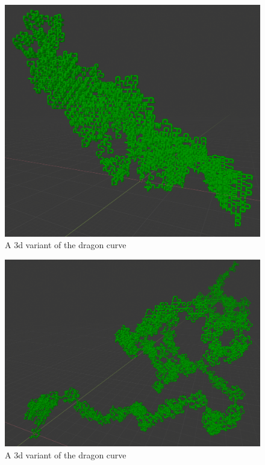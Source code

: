 \begin{figure}[H]
    \centering
    \includegraphics[width=\textwidth]{figures/L-systems/dragon0-3d.png}
    \caption{A 3d variant of the dragon curve}
\end{figure}

\begin{figure}[H]
    \centering
    \includegraphics[width=\textwidth]{figures/L-systems/dragon1-3d.png}
    \caption{A 3d variant of the dragon curve}
\end{figure}

